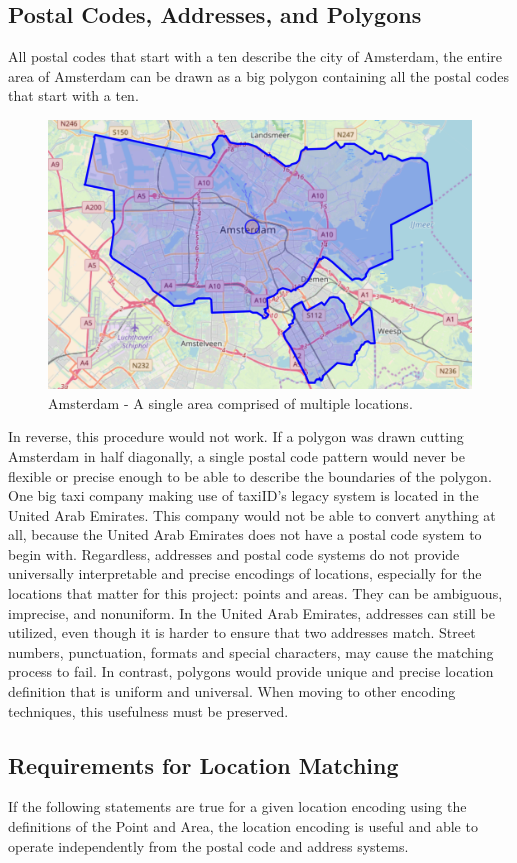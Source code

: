 \subsection{Postal Codes, Addresses, and Polygons}
All postal codes that start with a ten describe the city of Amsterdam, the entire area of Amsterdam can be drawn as a big polygon containing all the postal codes that start with a ten.

\begin{figure}[H]
	\centering
	\includegraphics[width=.8\textwidth]{Amsterdam}
	\caption[Amsterdam Drawn Polygon]{Amsterdam - A single area comprised of multiple locations.}
	\label{fig:Amsterdam}
\end{figure}

In reverse, this procedure would not work. If a polygon was drawn cutting Amsterdam in half diagonally, a single postal code pattern would never be flexible or precise enough to be able to describe the boundaries of the polygon. One big taxi company making use of taxiID's legacy system is located in the United Arab Emirates. This company would not be able to convert anything at all, because the United Arab Emirates does not have a postal code system to begin with. Regardless, addresses and postal code systems do not provide universally interpretable and precise encodings of locations, especially for the locations that matter for this project: points and areas. They can be ambiguous, imprecise, and nonuniform. In the United Arab Emirates, addresses can still be utilized, even though it is harder to ensure that two addresses match. Street numbers, punctuation, formats and special characters, may cause the matching process to fail. In contrast, polygons would provide unique and precise location definition that is uniform and universal. When moving to other encoding techniques, this usefulness must be preserved.

\subsection{Requirements for Location Matching}
If the following statements are true for a given location encoding using the definitions of the Point and Area, the location encoding is useful and able to operate independently from the postal code and address systems.

